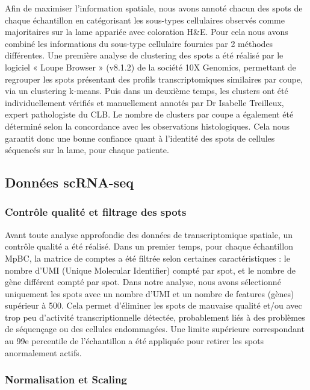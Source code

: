 \documentclass[11pt]{article}
\begin{document}
Afin de maximiser l’information spatiale, nous avons annoté chacun des spots de chaque échantillon en catégorisant les sous-types cellulaires observés comme majoritaires sur la lame appariée avec coloration H\&E. Pour cela nous avons combiné les informations du sous-type cellulaire fournies par 2 méthodes différentes.
Une première analyse de clustering des spots a été réalisé par le logiciel « Loupe Browser » (v8.1.2) \cite{LoupeBrowser812} de la société 10X Genomics, permettant de regrouper les spots présentant des profils transcriptomiques similaires par coupe, via un clustering k-means.
Puis dans un deuxième temps, les clusters ont été individuellement vérifiés et manuellement annotés par Dr Isabelle Treilleux, expert pathologiste du CLB. Le nombre de clusters par coupe a également été déterminé selon la concordance avec les observations histologiques. Cela nous garantit donc une bonne confiance quant à l’identité des spots de cellules séquencés sur la lame, pour chaque patiente.

\subsection{Données scRNA-seq}

\subsubsection{Contrôle qualité et filtrage des spots}

Avant toute analyse approfondie des données de transcriptomique spatiale, un contrôle qualité a été réalisé. Dans un premier temps, pour chaque échantillon MpBC, la matrice de comptes a été filtrée selon certaines caractéristiques : le nombre d’UMI (Unique Molecular Identifier) compté par spot, et le nombre de gène différent compté par spot. Dans notre analyse, nous avons sélectionné uniquement les spots avec un nombre d’UMI et un nombre de features (gènes) supérieur à 500. Cela permet d’éliminer les spots de mauvaise qualité et/ou avec trop peu d’activité transcriptionnelle détectée, probablement liés à des problèmes de séquençage ou des cellules endommagées. Une limite supérieure correspondant au 99e percentile de l’échantillon a été appliquée pour retirer les spots anormalement actifs.

\subsubsection{Normalisation et Scaling}
\end{document}
